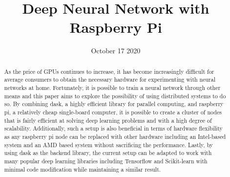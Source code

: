 \documentclass{IEEEtran}
\begin{document}
    \title{Deep Neural Network with Raspberry Pi}


    \author{
    }
    \date{October 17 2020}
    \maketitle

    \begin{abstract}
        As the price of GPUs continues to increase, it has become increasingly difficult for average consumers to obtain the necessary hardware for experimenting with neural networks at home. Fortunately, it is possible to train a neural network through other means and this paper aims to explore the possibility of using distributed systems to do so. By combining dask, a highly efficient library for parallel computing, and raspberry pi, a relatively cheap single-board computer, it is possible to create a cluster of nodes that is fairly efficient at solving deep learning problems and with a high degree of scalability. Additionally, such a setup is also beneficial in terms of hardware flexibility as any raspberry pi node can be replaced with other hardware including an Intel-based system and an AMD based system without sacrificing the performance. Lastly, by using dask as the backend library, the current setup can be adapted to work with many popular deep learning libraries including Tensorflow and Scikit-learn with minimal code modification while maintaining a similar result.
        \end{abstract}
\end{document}
